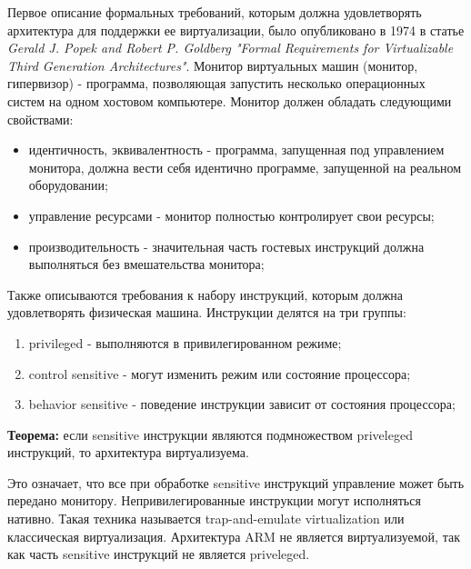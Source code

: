 Первое описание формальных требований, которым должна удовлетворять архитектура для поддержки ее виртуализации, было опубликовано в 1974 в статье {\it Gerald J. Popek and Robert P. Goldberg "Formal Requirements for Virtualizable Third Generation Architectures"}\cite{popek_goldberg}. Монитор виртуальных машин (монитор, гипервизор) - программа, позволяющая запустить несколько операционных систем на одном хостовом компьютере. Монитор должен обладать следующими свойствами:

\begin{itemize}
    \item идентичность, эквивалентность - программа, запущенная под управлением монитора, должна вести себя идентично программе, запущенной на реальном оборудовании;
    \item управление ресурсами - монитор полностью контролирует свои ресурсы;
    \item производительность - значительная часть гостевых инструкций должна выполняться без вмешательства монитора;
\end{itemize}

Также описываются требования к набору инструкций, которым должна удовлетворять физическая машина. Инструкции делятся на три группы:

\begin{enumerate}
    \item privileged - выполняются в привилегированном режиме;
    \item control sensitive - могут изменить режим или состояние процессора;
    \item behavior sensitive - поведение инструкции зависит от состояния процессора;
\end{enumerate}

{\bf Теорема: } если sensitive инструкции являются подмножеством priveleged инструкций, то архитектура виртуализуема.

Это означает, что все при обработке sensitive инструкций управление может быть передано монитору. Непривилегированные инструкции могут исполняться нативно. Такая техника называется trap-and-emulate virtualization или классическая виртуализация. Архитектура ARM не является виртуализуемой, так как часть sensitive инструкций не является priveleged.

